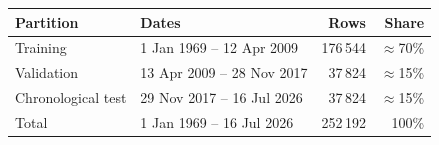 \begin{center}
\begin{tabular}{@{}llrr@{}}
\toprule
Partition & Dates & Rows & Share \\
\midrule
Training & 1 Jan 1969 -- 12 Apr 2009 & 176\,544 & $\approx$70\% \\
Validation & 13 Apr 2009 -- 28 Nov 2017 & 37\,824 & $\approx$15\% \\
Chronological test & 29 Nov 2017 -- 16 Jul 2026 & 37\,824 & $\approx$15\% \\
\midrule
Total & 1 Jan 1969 -- 16 Jul 2026 & 252\,192 & 100\% \\
\bottomrule
\end{tabular}
\label{tab:splits}
\end{center}
